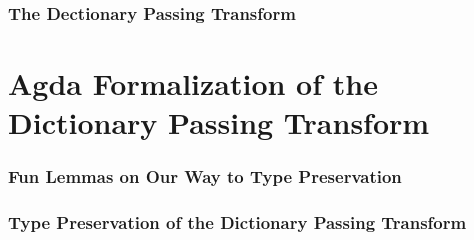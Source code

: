 \documentclass{beamer}
\begin{document}
\begin{frame}[fragile]
  \frametitle{The Dectionary Passing Transform}
\end{frame}

\section{Agda Formalization of the Dictionary Passing Transform}
\begin{frame}[fragile]
  \frametitle{Fun Lemmas on Our Way to Type Preservation}
  
\end{frame}

\begin{frame}[fragile]
  \frametitle{Type Preservation of the Dictionary Passing Transform}
  
\end{frame}
\end{document}
